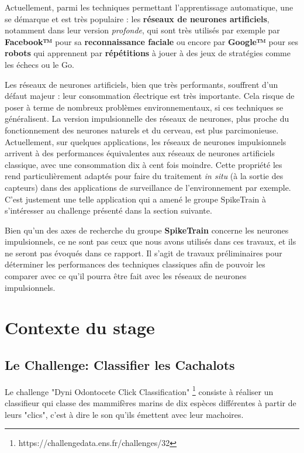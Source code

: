 Actuellement, parmi les techniques permettant l'apprentissage
automatique, une se démarque et est très populaire : les
\textbf{réseaux de neurones artificiels}, notamment dans leur version
\emph{profonde}, qui sont très utilisés par exemple par \textbf{Facebook™}
pour sa \textbf{reconnaissance faciale} ou encore par \textbf{Google™}
pour ses \textbf{robots} qui apprennent par \textbf{répétitions} à jouer
à des jeux de stratégies comme les échecs ou le Go.

Les réseaux de neurones artificiels, bien que très performants, souffrent d'un défaut
majeur : leur consommation électrique est très importante.
Cela risque de poser à terme de nombreux problèmes environnementaux, si ces techniques se généralisent.
La version impulsionnelle des réseaux de neurones, plus proche du fonctionnement des neurones naturels et du cerveau,
est plus parcimonieuse.
Actuellement, sur quelques applications, les réseaux de neurones impulsionnels arrivent à des performances équivalentes aux réseaux de neurones artificiels classique, avec une consommation dix à cent fois moindre.
Cette propriété les rend particulièrement adaptés pour faire du traitement \emph{in situ} (à la sortie des capteurs) dans des applications de surveillance de l'environnement par exemple.
C'est justement une telle application qui a amené le groupe SpikeTrain à s'intéresser au challenge présenté dans la section suivante.

Bien qu'un des axes de recherche du groupe \textbf{SpikeTrain} concerne les
neurones impulsionnels, ce ne sont pas ceux que nous avons utilisés dans ces
travaux, et ils ne seront pas évoqués dans ce rapport.
Il s'agit de travaux préliminaires pour déterminer les performances des techniques classiques
afin de pouvoir les comparer avec ce qu'il pourra être fait avec les réseaux de neurones
impulsionnels.


\hypertarget{Contexte}{%
\section{Contexte du stage}\label{Contexte}}

\hypertarget{Le-Challenge}{%
\subsection{Le Challenge: Classifier les Cachalots}\label{Le-Challenge}}

Le challenge "Dyni Odontocete Click Classification"%
\footnote{https://challengedata.ens.fr/challenges/32} consiste à réaliser un classifieur qui classe des mammifères marins de dix espèces différentes à partir de leurs "clics", c'est à dire le son qu'ils émettent avec leur machoires.

